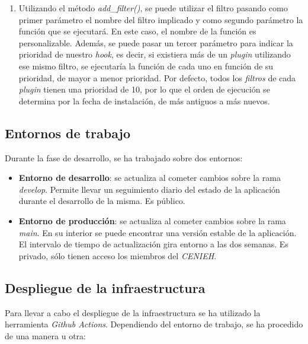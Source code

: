 
\begin{enumerate}
\def\labelenumi{\arabic{enumi}.}
\setcounter{enumi}{1}
\tightlist
\item
  Utilizando el método \emph{add\_filter()}, se puede utilizar el filtro
  pasando como primer parámetro el nombre del filtro implicado y como
  segundo parámetro la función que se ejecutará. En este caso, el nombre
  de la función es personalizable. Además, se puede pasar un tercer
  parámetro para indicar la prioridad de nuestro \emph{hook}, es decir,
  si existiera más de un \emph{plugin} utilizando ese mismo filtro, se
  ejecutaría la función de cada uno en función de su prioridad, de mayor
  a menor prioridad. Por defecto, todos los \emph{filtros} de cada
  \emph{plugin} tienen una prioridad de 10, por lo que el orden de
  ejecución se determina por la fecha de instalación, de más antiguos a
  más nuevos.
\end{enumerate}


\subsection{Entornos de trabajo}

Durante la fase de desarrollo, se ha trabajado sobre dos entornos:

\begin{itemize}
\tightlist
\item
  \textbf{Entorno de desarrollo}: se actualiza al cometer cambios sobre
  la rama \emph{develop}. Permite llevar un seguimiento diario del
  estado de la aplicación durante el desarrollo de la misma. Es público.
\item
  \textbf{Entorno de producción}: se actualiza al cometer cambios sobre
  la rama \emph{main}. En su interior se puede encontrar una versión
  estable de la aplicación. El intervalo de tiempo de actualización gira
  entorno a las dos semanas. Es privado, sólo tienen acceso los miembros
  del \emph{CENIEH}.
\end{itemize}

\subsection{Despliegue de la infraestructura}

Para llevar a cabo el despliegue de la infraestructura se ha utilizado
la herramienta \emph{Github Actions}. Dependiendo del entorno de
trabajo, se ha procedido de una manera u otra:


